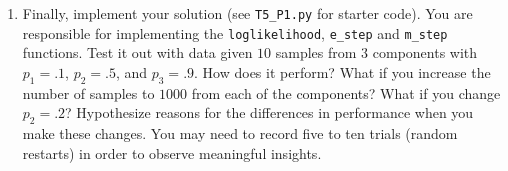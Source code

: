 \documentclass[submit]{harvardml}
\begin{document}
\begin{problem}
\begin{enumerate}
\item Finally, implement your solution (see \texttt{T5\_P1.py} for starter code).  You are responsible for implementing the \texttt{loglikelihood}, \texttt{e\_step} and \texttt{m\_step} functions. Test it out with data given
  $10$ samples from $3$ components with $p_1 = .1$, $p_2=.5$, and
  $p_3=.9$.  How does it perform?  What if you increase the number of
  samples to $1000$ from each of the components?  What if you change
  $p_2=.2$?  Hypothesize reasons for the differences in performance
  when you make these changes. You may need to record five to ten trials (random restarts) in order to observe meaningful insights.

\end{enumerate}



\end{problem}
\end{document}
